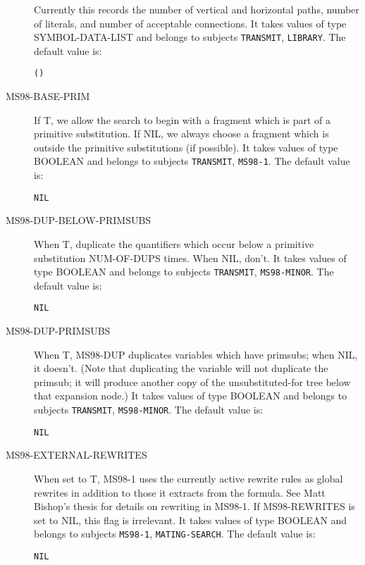 \begin{description}
Currently this records the number of vertical and horizontal paths,
number of literals, and number of acceptable connections.
It takes values of type SYMBOL-DATA-LIST and belongs to subjects \texttt{TRANSMIT}, \texttt{LIBRARY}.  The default value is: \begin{lstlisting}
()
\end{lstlisting}

\item[MS98-BASE-PRIM]  
If T, we allow the search to begin with a fragment which is part
of a primitive substitution. If NIL, we always choose a fragment which is outside 
the primitive substitutions (if possible).
It takes values of type BOOLEAN and belongs to subjects \texttt{TRANSMIT}, \texttt{MS98-1}.  The default value is: \begin{lstlisting}
NIL
\end{lstlisting}

\item[MS98-DUP-BELOW-PRIMSUBS]  
When T, duplicate the quantifiers which occur below 
a primitive substitution NUM-OF-DUPS times. When NIL, don't.
It takes values of type BOOLEAN and belongs to subjects \texttt{TRANSMIT}, \texttt{MS98-MINOR}.  The default value is: \begin{lstlisting}
NIL
\end{lstlisting}

\item[MS98-DUP-PRIMSUBS]  
When T, MS98-DUP duplicates variables which have primsubs;
when NIL, it doesn't. (Note that duplicating the variable will
not duplicate the primsub; it will produce another copy of the 
unsubstituted-for tree below that expansion node.)
It takes values of type BOOLEAN and belongs to subjects \texttt{TRANSMIT}, \texttt{MS98-MINOR}.  The default value is: \begin{lstlisting}
NIL
\end{lstlisting}

\item[MS98-EXTERNAL-REWRITES]  
When set to T, MS98-1 uses the currently active rewrite rules as
global rewrites in addition to those it extracts from the formula.
See Matt Bishop's thesis for details on rewriting in MS98-1.
If MS98-REWRITES is set to NIL, this flag is irrelevant.
It takes values of type BOOLEAN and belongs to subjects \texttt{MS98-1}, \texttt{MATING-SEARCH}.  The default value is: \begin{lstlisting}
NIL
\end{lstlisting}


\end{description}
